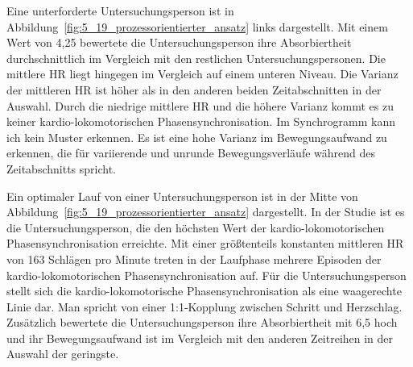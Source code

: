 Eine unterforderte Untersuchungsperson ist in Abbildung~\ref{fig:5_19_prozessorientierter_ansatz} links dargestellt. Mit einem Wert von 4,25 bewertete die Untersuchungsperson ihre Absorbiertheit durchschnittlich im Vergleich mit den restlichen Untersuchungspersonen. Die mittlere \ac{HR} liegt hingegen im Vergleich auf einem unteren Niveau. Die Varianz der mittleren \ac{HR} ist höher als in den anderen beiden Zeitabschnitten in der Auswahl. Durch die niedrige mittlere \ac{HR} und die höhere Varianz kommt es zu keiner kardio-lokomotorischen Phasensynchronisation. Im Synchrogramm kann ich kein Muster erkennen. Es ist eine hohe Varianz im Bewegungsaufwand zu erkennen, die für variierende und unrunde Bewegungsverläufe während des Zeitabschnitts spricht. 

\begin{sidewaysfigure}
	\resizebox{1.00\textwidth}{!}{%
		
		}%
	\caption[Prozessdarstellung im Verlauf des Laufess (Studie: Laufen)]{Prozessdarstellung im Verlauf des Laufens -- Drei Minuten Daten einer Untersuchungsperson, die sich unterfordert hat (links), einer Untersuchungsperson, die ihr optimales Tempo gefunden hat (mitte) und einer Untersuchungsperson, die sich überfordert hat (rechts). Quelle: Eigene Darstellung \\ \hspace{\textwidth}\emph{Anmerkung}: Bew. = Bewegungsaufwand \\ \hspace{\textwidth}Rel. Phase = Relative Phase}
	\label{fig:5_19_prozessorientierter_ansatz}
\end{sidewaysfigure}

Ein optimaler Lauf von einer Untersuchungsperson ist in der Mitte von Abbildung~\ref{fig:5_19_prozessorientierter_ansatz} dargestellt. In der Studie ist es die Untersuchungsperson, die den höchsten Wert der kardio-lokomotorischen Phasensynchronisation erreichte. Mit einer größtenteils konstanten mittleren \ac{HR} von 163 Schlägen pro Minute treten in der Laufphase mehrere Episoden der kardio-lokomotorischen Phasensynchronisation auf. Für die Untersuchungsperson stellt sich die kardio-lokomotorische Phasensynchronisation als eine waagerechte Linie dar. Man spricht von einer 1:1-Kopplung zwischen Schritt und Herzschlag. Zusätzlich bewertete die Untersuchungsperson ihre Absorbiertheit mit 6,5 hoch und ihr Bewegungsaufwand ist im Vergleich mit den anderen Zeitreihen in der Auswahl der geringste. 

